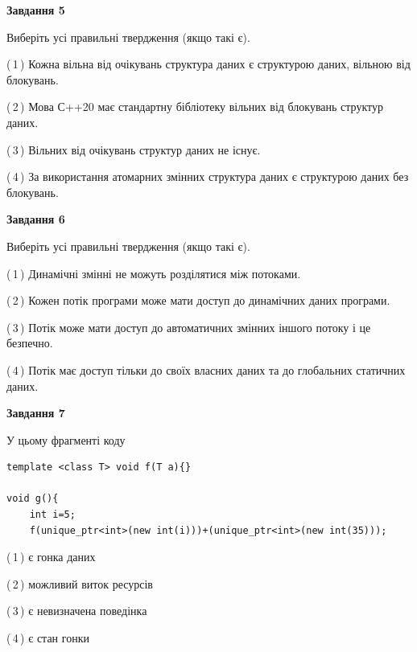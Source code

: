 \documentclass[12pt, ukrainian]{article}
\begin{document}
\begin {large}
{\begin{center}
\textbf{Завдання 5}
\end{center}

Виберіть усі правильні твердження (якщо такі є).\par
\vspace{2mm}

(\,1\,) Кожна вільна від очікувань структура даних є структурою даних, вільною від блокувань.%

(\,2\,) Мова С++20 має стандартну бібліотеку вільних від блокувань структур даних.%

(\,3\,) Вільних від очікувань структур даних не існує.%

(\,4\,) За використання атомарних змінних структура даних є структурою даних без блокувань.%
\newpage


\begin{center}
\textbf{Завдання 6}
\end{center}

Виберіть усі правильні твердження (якщо такі є).\par
\vspace{2mm}

(\,1\,) Динамічні змінні не можуть розділятися між потоками.%

(\,2\,) Кожен потік програми може мати доступ до динамічних даних програми.%

(\,3\,) Потік може мати доступ до автоматичних змінних іншого потоку і це безпечно.%

(\,4\,) Потік має доступ тільки до своїх власних даних та до глобальних статичних даних.%


\begin{center}
\textbf{Завдання 7}
\end{center}

У цьому фрагменті коду
\begin{verbatim}
template <class T> void f(T a){}

void g(){
    int i=5;
    f(unique_ptr<int>(new int(i)))+(unique_ptr<int>(new int(35)));
\end{verbatim}
(\,1\,) є гонка даних%

(\,2\,) можливий виток ресурсів%

(\,3\,) є невизначена поведінка%

(\,4\,) є стан гонки%

}
\end {large}

\vspace{4mm}
\newpage
\end{document}
